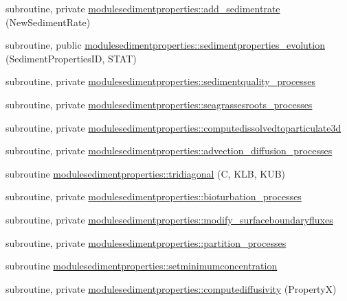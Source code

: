 \begin{DoxyCompactItemize}
\item 
subroutine, private \mbox{\hyperlink{namespacemodulesedimentproperties_a01426b1d7936843c8ff328ebd6feba46}{modulesedimentproperties\+::add\+\_\+sedimentrate}} (New\+Sediment\+Rate)
\item 
subroutine, public \mbox{\hyperlink{namespacemodulesedimentproperties_ac0e9a7cb95c81a6f95797a7750889730}{modulesedimentproperties\+::sedimentproperties\+\_\+evolution}} (Sediment\+Properties\+ID, S\+T\+AT)
\item 
subroutine, private \mbox{\hyperlink{namespacemodulesedimentproperties_a226feff76b7adff9c39d5d0b84ea662e}{modulesedimentproperties\+::sedimentquality\+\_\+processes}}
\item 
subroutine, private \mbox{\hyperlink{namespacemodulesedimentproperties_abe11ce25dab5cf7abc26eeb1fb7fdcd9}{modulesedimentproperties\+::seagrassesroots\+\_\+processes}}
\item 
subroutine, private \mbox{\hyperlink{namespacemodulesedimentproperties_ad4fd225155211238920de3285f222390}{modulesedimentproperties\+::computedissolvedtoparticulate3d}}
\item 
subroutine, private \mbox{\hyperlink{namespacemodulesedimentproperties_ad4e53e8aa65867e0dd71960c0df2dc06}{modulesedimentproperties\+::advection\+\_\+diffusion\+\_\+processes}}
\item 
subroutine \mbox{\hyperlink{namespacemodulesedimentproperties_a36e12eab9520e6564647d977991906bf}{modulesedimentproperties\+::tridiagonal}} (C, K\+LB, K\+UB)
\item 
subroutine, private \mbox{\hyperlink{namespacemodulesedimentproperties_a1d7c298cf760f1e569bc908fe283cb62}{modulesedimentproperties\+::bioturbation\+\_\+processes}}
\item 
subroutine, private \mbox{\hyperlink{namespacemodulesedimentproperties_a747aaf088749f649d9ca7c244a31c529}{modulesedimentproperties\+::modify\+\_\+surfaceboundaryfluxes}}
\item 
subroutine, private \mbox{\hyperlink{namespacemodulesedimentproperties_a28bead70b224e32b9105e7f44858867d}{modulesedimentproperties\+::partition\+\_\+processes}}
\item 
subroutine \mbox{\hyperlink{namespacemodulesedimentproperties_a9f511535dd36e19d03774f384ee21bc9}{modulesedimentproperties\+::setminimumconcentration}}
\item 
subroutine, private \mbox{\hyperlink{namespacemodulesedimentproperties_a1bb06862669d539399995d64ea159fde}{modulesedimentproperties\+::computediffusivity}} (PropertyX)
\item 

\end{DoxyCompactItemize}
